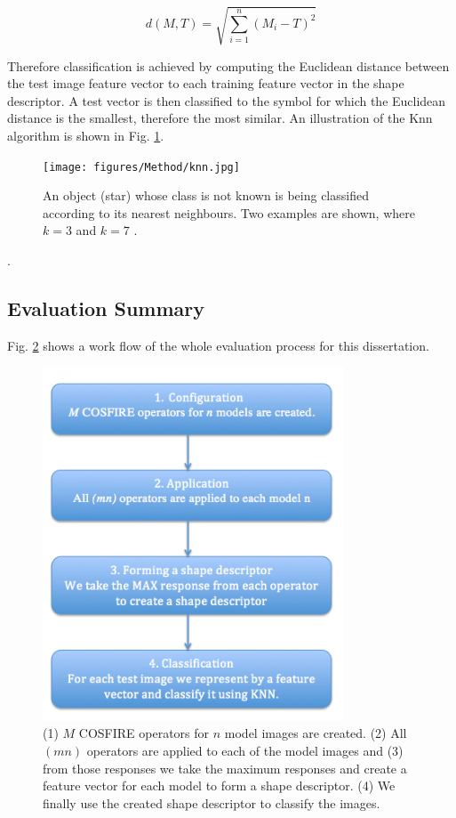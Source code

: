 \begin{equation}
    d(M,T) = \sqrt{\sum_{i=1}^{n} (M_{i}-T)^2}
\end{equation}

Therefore classification is achieved by computing the Euclidean distance between the test image feature vector to each training feature vector in the shape descriptor. A test vector is then classified to the symbol for which the Euclidean distance is the smallest, therefore the most similar. An illustration of the Knn algorithm is shown in Fig. \ref{fig:knnexample}.


\begin{figure}[h]
    \centering
    \texttt{[image: figures/Method/knn.jpg]}
    \caption[Example of K-nearest Neighbour algorithm]{An object (star) whose class is not known is being classified according to its nearest neighbours. Two examples are shown, where $k=3$ and $k=7$ \footnotemark.}
    \label{fig:knnexample}
\end{figure}
\vspace{100mm}

.
\vspace{200mm}
\subsection{Evaluation Summary} 
Fig. \ref{fig:flowchart} shows a work flow of the whole evaluation process for this dissertation.
\begin{figure}[h]
        \centering
        \includegraphics[width=0.8\textwidth]{figures/Method/workflow3.png}
        \caption[Evaluation flow chart]{(1) $M$ COSFIRE operators for $n$ model images are created. (2) All $(mn)$ operators are applied to each of the model images and (3) from those responses we take the maximum responses and create a feature vector for each model to form a shape descriptor. (4) We finally use the created shape descriptor to classify the images.  }
        \label{fig:flowchart}
\end{figure}